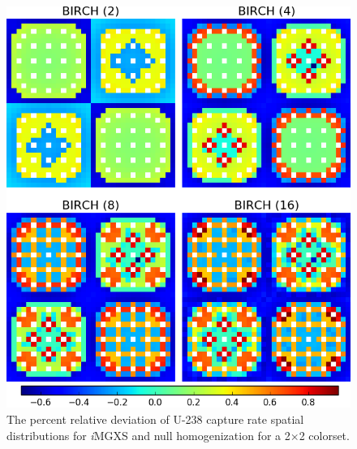\begin{figure}[h!]
\centering
\includegraphics[width=0.9\linewidth]{figures/results/compare/2x2/compare-capt}
\vspace{2mm}
\caption[U-238 capture rate \textit{i}MGXS-to-null relative deviations]{The percent relative deviation of U-238 capture rate spatial distributions for \textit{i}\ac{MGXS} and null homogenization for a 2$\times$2 colorset.}
\label{fig:chap11-2x2-capt-rates-comp}
\end{figure}

\clearpage

